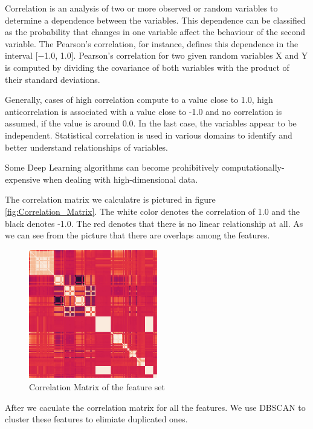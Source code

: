 \documentclass[5p]{elsarticle}
\begin{document}
Correlation is an analysis of two or more observed or random variables to determine a dependence between the variables. This dependence can be classified as the probability that changes in one variable affect the behaviour of the second variable. The Pearson’s correlation, for instance, defines this dependence in the interval [−1.0, 1.0]. Pearson’s correlation for two given random variables X and Y is computed by dividing the covariance of both variables with the product of their standard deviations.

Generally, cases of high correlation compute to a value close to 1.0, high anticorrelation is associated with a value close to -1.0 and no correlation is assumed, if the value is around 0.0. In the last case, the variables appear to be independent. Statistical correlation is used in various domains to identify and better understand relationships of variables.

Some Deep Learning algorithms can become prohibitively computationally-expensive when dealing with high-dimensional data.

The correlation matrix we calculatre is pictured in figure \ref{fig:Correlation_Matrix}. The white color denotes the correlation of 1.0 and the black denotes -1.0. The red denotes that there is no linear relationship at all. As we can see from the picture that there are overlaps among the features. 

\begin{figure}[h]
    \centering
    \includegraphics[width=0.5\textwidth]{Correlation_Matrix.png}
    \caption{Correlation Matrix of the feature set}
    \label{fig:Correlation_matrix}
\end{figure}

After we caculate the correlation matrix for all the features. We use DBSCAN to cluster these features to elimiate duplicated ones.
\end{document}
